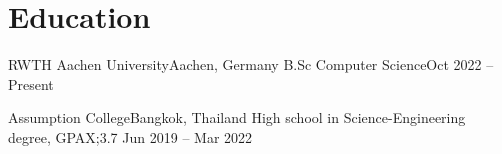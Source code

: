 \section{Education}
\resumeSubHeadingListStart
\resumeSubheading
{RWTH Aachen University}{Aachen, Germany}
{B.Sc Computer Science}{Oct 2022 -- Present}
\resumeItemListStart
{}
\resumeItemListEnd

\resumeSubheading
{Assumption College}{Bangkok, Thailand}
{High school in Science-Engineering degree, GPAX;3.7 }{ Jun 2019 -- Mar 2022}
\resumeSubHeadingListEnd
